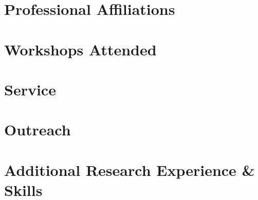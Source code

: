 \section*{Professional Affiliations}


\section*{Workshops Attended}


\section*{Service}


\section*{Outreach}


\section*{Additional Research Experience \& Skills}


% 


